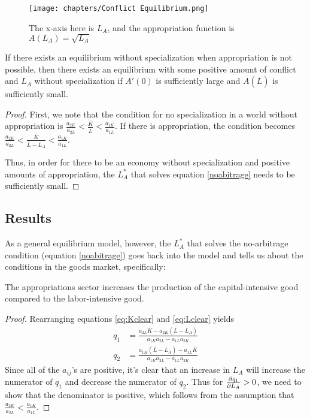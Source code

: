 \begin{figure}[H]\label{fg:equi}
    \centering
    \caption{The x-axis here is $L_A$, and the appropriation function is $A(L_A)= \sqrt{L_A}$}
    \texttt{[image: chapters/Conflict Equilibrium.png]}
\end{figure}

\begin{proposition}
    If there exists an equilibrium without specialization when appropriation is not possible, then there exists an equilibrium with some positive amount of conflict and $L_A$ without specialization if $A'(0)$ is sufficiently large and $A(\bar{L})$ is sufficiently small.
\end{proposition}
\begin{proof}
    First, we note that the condition for no specialization in a world without appropriation is $\frac{a_{2K}}{a_{2L}} < \frac{\bar{K}}{\bar{L}} < \frac{a_{1K}}{a_{1L}}$. If there is appropriation, the condition becomes $\frac{a_{2K}}{a_{2L}} < \frac{\bar{K}}{\bar{L} - L_A} < \frac{a_{1K}}{a_{1L}}$. 

    Thus, in order for there to be an economy without specialization and positive amounts of appropriation, the $L_A^*$ that solves equation \ref{noabitrage} needs to be sufficiently small.
\end{proof}
\subsection*{Results}
As a general equilibrium model, however, the $L_A^*$ that solves the no-arbitrage condition (equation \ref{noabitrage}) goes back into the model and tells us about the conditions in the goods market, specifically:
\begin{proposition}
    The appropriations sector increases the production of the capital-intensive good compared to the labor-intensive good.
\end{proposition}
\begin{proof}
    Rearranging equations \ref{eq:Kclear} and \ref{eq:Lclear} yields
    \begin{align*}
        q_1 & = \frac{a_{2L}\bar{K} - a_{2K}(\bar{L} - L_A)}{a_{1K}a_{2L} - a_{1L}a_{2K}} \\ 
        q_2 & = \frac{a_{1K}(\bar{L} - L_A) - a_{1L}\bar{K}}{a_{1K}a_{2L} - a_{1L}a_{2K}}
    \end{align*}
    Since all of the $a_{ij}$'s are positive, it's clear that an increase in $L_A$ will increase the numerator of $q_1$ and decrease the numerator of $q_2$. Thus for $\frac{\partial q_1}{\partial L_A} > 0$, we need to show that the denominator is positive, which follows from the assumption that $\frac{a_{2K}}{a_{2L}} < \frac{a_{1K}}{a_{1L}}$.
\end{proof}

